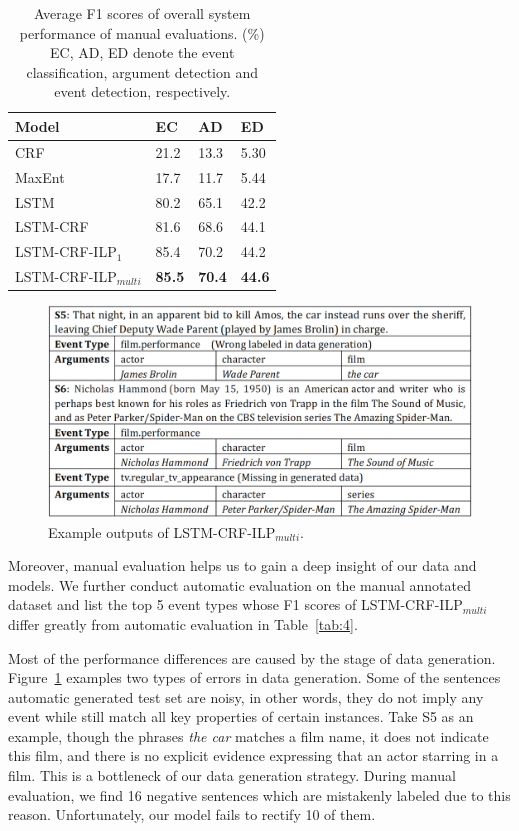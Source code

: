 \documentclass{article}
\begin{document}
\begin{table}[h]
\small
\centering
\begin{tabular}{|l|p{0.8cm}<{\centering}|p{0.8cm}<{\centering}|p{0.8cm}<{\centering}|} \hline
	Model & EC & AD & ED \\ \hline
	CRF & 21.2 & 13.3 & 5.30 \\ \hline
	MaxEnt & 17.7 & 11.7 & 5.44 \\ \hline
	LSTM & 80.2 & 65.1 & 42.2 \\ \hline \hline
	LSTM-CRF & 81.6 & 68.6 & 44.1 \\ \hline
	LSTM-CRF-ILP$_{1}$ & 85.4 & 70.2 & 44.2 \\ \hline
	LSTM-CRF-ILP$_{multi}$ & \textbf{85.5} & \textbf{70.4} & \textbf{44.6} \\ \hline
\end{tabular}
\caption{Average F1 scores of overall system performance of manual evaluations. (\%) EC, AD, ED denote the event classification, argument detection and event detection, respectively. \label{tab:2}}
\end{table}

\begin{figure}[h]
	\centering
	\includegraphics[width=.48\textwidth]{example.png}
	\caption{Example outputs of LSTM-CRF-ILP$_{multi}$.\label{fig:1}}
\end{figure}

Moreover, manual evaluation helps us to gain a deep insight of our data and models. We further conduct automatic evaluation on the manual annotated dataset and list the top 5 event types whose F1 scores of LSTM-CRF-ILP$_{multi}$ differ greatly from automatic evaluation in Table~\ref{tab:4}.

Most of the performance differences are caused by the stage of data generation. Figure~\ref{fig:1} examples two types of errors in data generation. Some of the sentences automatic generated test set are noisy, in other words, they do not imply any event while still match all key properties of certain instances. Take S5 as an example, though the phrases \emph{the car} matches a film name, it does not indicate this film, and there is no explicit evidence expressing that an actor starring in a film. This is a bottleneck of our data generation strategy. During manual evaluation, we find 16 negative sentences which are mistakenly labeled due to this reason. Unfortunately, our model fails to rectify 10 of them.
\end{document}
